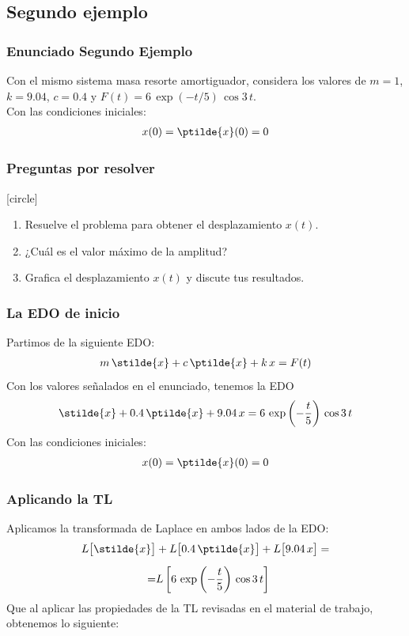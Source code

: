 \subsection{Segundo ejemplo}
\begin{frame}
\frametitle{Enunciado Segundo Ejemplo}
Con el mismo sistema masa resorte amortiguador, considera los valores de $m = 1$, $k = 9.04$, $c= 0.4$ y $F(t) =  6 \, \exp(-t/5) \, \cos 3 \, t$.
\\
\bigskip
Con las condiciones iniciales:
\begin{align*}
x(0) = \ptilde{x}(0) = 0
\end{align*}
\end{frame}
\begin{frame}
\frametitle{Preguntas por resolver}
[circle]
\begin{enumerate}[<+->]
\item Resuelve el problema para obtener el desplazamiento $x(t)$.
\item ¿Cuál es el valor máximo de la amplitud?
\item Grafica el desplazamiento $x(t)$ y discute tus resultados.
\end{enumerate}
\end{frame}
\begin{frame}
\frametitle{La EDO de inicio}
Partimos de la siguiente EDO:
\begin{align*}
m \, \stilde{x} + c \, \ptilde{x} + k \, x = F(t)
\end{align*}
\pause
Con los valores señalados en el enunciado, tenemos la EDO
\begin{align*}
\stilde{x} + 0.4 \, \ptilde{x} + 9.04 \, x = 6 \, \exp\left( -\dfrac{t}{5}\right) \, \cos 3 \, t
\end{align*}
Con las condiciones iniciales:
\begin{align*}
x(0) = \ptilde{x}(0) = 0
\end{align*}
\end{frame}
\begin{frame}
\frametitle{Aplicando la TL}
Aplicamos la transformada de Laplace en ambos lados de la EDO:
\begin{align*}
L \big[\stilde{x}\big] &+ L\big[0.4 \, \ptilde{x}\big] + L \big[9.04 \, x\big] = \\[0.5em]
=& L \left[ 6 \, \exp \left( -\dfrac{t}{5}\right) \, \cos 3 \, t \right]
\end{align*}
\pause
Que al aplicar las propiedades de la TL revisadas en el material de trabajo, obtenemos lo siguiente:
\end{frame}
